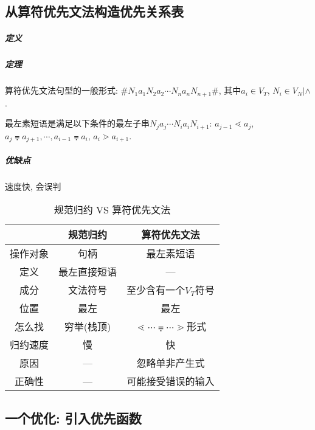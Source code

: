         \subsection{从算符优先文法构造优先关系表}

            \subparagraph{定义}


            \subparagraph{定理}

                算符优先文法句型的一般形式: $\#N_1a_1N_2a_2\cdots N_na_nN_{n+1}\#$, 其中$a_i\in V_T$, $N_i\in V_N|\wedge$.

                \textsf{最左素短语}是满足以下条件的最左子串$N_ja_j\cdots N_ia_iN_{i+1}$: $a_{j-1}\lessdot a_j$, $a_j\eqdot a_{j+1}, \cdots, a_{i-1}\eqdot a_i$, $a_i\gtrdot a_{i+1}$.



            \subparagraph{优缺点}

                速度快, 会误判

                \begin{table}[h!]
                    \centering
                    \caption{规范归约 VS 算符优先文法}
                    \label{tab:gfgyvcsfyx}
                    \begin{tabular}{ccc}\toprule
                        & 规范归约 & 算符优先文法 \\ \midrule
                        操作对象 & 句柄 & 最左素短语 \\
                        定义 & 最左直接短语 & --- \\
                        成分 & 文法符号 & 至少含有一个$V_T$符号 \\
                        位置 & 最左 & 最左 \\
                        怎么找 & 穷举(栈顶) & $\lessdot\cdots\eqdot\cdots\gtrdot$形式 \\
                        归约速度 & 慢 & 快 \\
                        原因 & --- & 忽略单非产生式 \\
                        正确性 & --- & 可能接受错误的输入 \\
                        \bottomrule
                    \end{tabular}
                \end{table}

        \subsection{一个优化: 引入优先函数}

